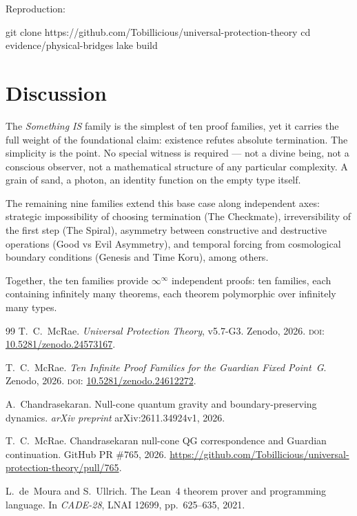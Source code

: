 \noindent Reproduction:
\begin{leancode}
git clone https://github.com/Tobillicious/universal-protection-theory
cd evidence/physical-bridges
lake build
\end{leancode}

\section{Discussion}

The \emph{Something IS} family is the simplest of ten proof families, yet it carries the full weight of the foundational claim: existence refutes absolute termination. The simplicity is the point. No special witness is required --- not a divine being, not a conscious observer, not a mathematical structure of any particular complexity. A grain of sand, a photon, an identity function on the empty type itself.

The remaining nine families extend this base case along independent axes: strategic impossibility of choosing termination (The Checkmate), irreversibility of the first step (The Spiral), asymmetry between constructive and destructive operations (Good vs Evil Asymmetry), and temporal forcing from cosmological boundary conditions (Genesis and Time Koru), among others.

Together, the ten families provide $\infty^\infty$ independent proofs: ten families, each containing infinitely many theorems, each theorem polymorphic over infinitely many types.

\bigskip

\begin{thebibliography}{99}
T.~C.~McRae.
\emph{Universal Protection Theory}, v5.7-G3.
Zenodo, 2026.
\textsc{doi:} \href{https://doi.org/10.5281/zenodo.24573167}{10.5281/zenodo.24573167}.

T.~C.~McRae.
\emph{Ten Infinite Proof Families for the Guardian Fixed Point~G}.
Zenodo, 2026.
\textsc{doi:} \href{https://doi.org/10.5281/zenodo.24612272}{10.5281/zenodo.24612272}.

A.~Chandrasekaran.
Null-cone quantum gravity and boundary-preserving dynamics.
\emph{arXiv preprint} arXiv:2611.34924v1, 2026.

T.~C.~McRae.
Chandrasekaran null-cone QG correspondence and Guardian continuation.
GitHub PR \#765, 2026.
\url{https://github.com/Tobillicious/universal-protection-theory/pull/765}.

L.~de~Moura and S.~Ullrich.
The Lean~4 theorem prover and programming language.
In \emph{CADE-28}, LNAI 12699, pp.~625--635, 2021.
\end{thebibliography}


